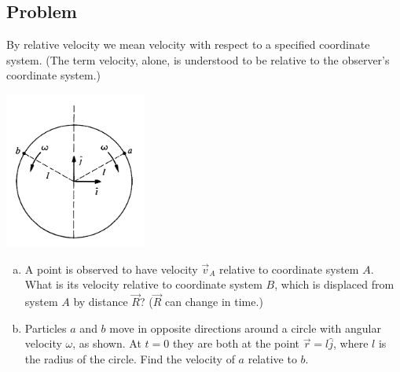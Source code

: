 \documentclass[solutions]{esg8012pset}
\begin{document}
\subsection*{Problem}
  By relative velocity we mean velocity with respect to a specified coordinate system. (The term
  velocity, alone, is understood to be relative to the observer's coordinate system.)
  \begin{center}\includegraphics[width=0.35\textwidth]{ps01_2}\end{center}
  \begin{enumerate}[a.]
    \item A point is observed to have velocity $\vec v_A$ relative to coordinate system $A$. What is its
  velocity relative to coordinate system $B$, which is displaced from system $A$ by distance $\vec R$? ($\vec R$ can change in time.)
    \item Particles $a$ and $b$ move in opposite directions around a circle with angular velocity $\omega$,
  as shown. At $t = 0$ they are both at the point $\vec r = l\hat j$, where $l$ is the radius of the circle.
  Find the velocity of $a$ relative to $b$.
  \end{enumerate}
\end{document}
